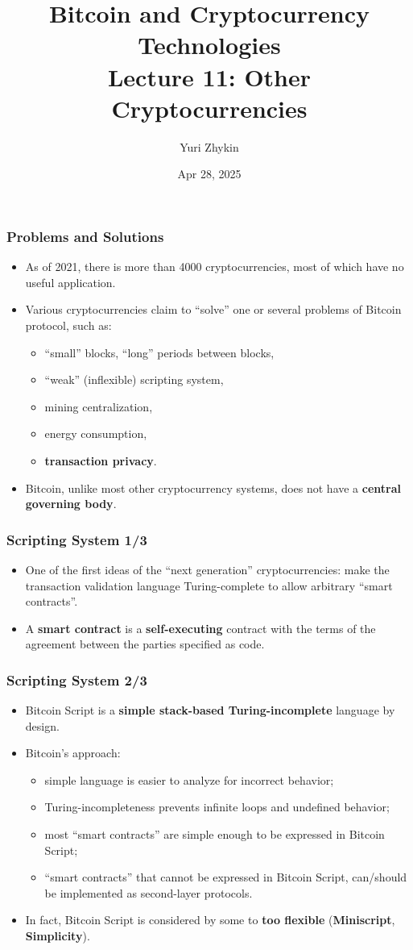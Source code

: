\documentclass{beamer}
\title{
  Bitcoin and Cryptocurrency Technologies \\
  Lecture 11: Other Cryptocurrencies
}
\author{Yuri Zhykin}
\date{Apr 28, 2025}
\begin{document}
\frame{\titlepage}

\begin{frame}
  \frametitle{Problems and Solutions}
  \begin{itemize}
  \item As of 2021, there is more than 4000 cryptocurrencies, most of which
    have no useful application.
  \item Various cryptocurrencies claim to ``solve'' one or several problems of
    Bitcoin protocol, such as:
    \begin{itemize}
    \item ``small'' blocks, ``long'' periods between blocks,
    \item ``weak'' (inflexible) scripting system,
    \item mining centralization,
    \item energy consumption,
    \item \textbf{transaction privacy}.
    \end{itemize}
  \item Bitcoin, unlike most other cryptocurrency systems, does not have a
    \textbf{central governing body}.
  \end{itemize}
\end{frame}

\begin{frame}
  \frametitle{Scripting System 1/3}
  \begin{itemize}
  \item One of the first ideas of the ``next generation'' cryptocurrencies: make
    the transaction validation language Turing-complete to allow arbitrary
    ``smart contracts''.
  \item A \textbf{smart contract} is a \textbf{self-executing} contract with the
    terms of the agreement between the parties specified as code.
  \end{itemize}
\end{frame}

\begin{frame}
  \frametitle{Scripting System 2/3}
  \begin{itemize}
  \item Bitcoin Script is a \textbf{simple stack-based Turing-incomplete}
    language by design.
  \item Bitcoin's approach:
    \begin{itemize}
    \item simple language is easier to analyze for incorrect behavior;
    \item Turing-incompleteness prevents infinite loops and undefined behavior;
    \item most ``smart contracts'' are simple enough to be expressed in Bitcoin
      Script;
    \item ``smart contracts'' that cannot be expressed in Bitcoin Script,
      can/should be implemented as second-layer protocols.
    \end{itemize}
  \item In fact, Bitcoin Script is considered by some to \textbf{too flexible}
    (\textbf{Miniscript}, \textbf{Simplicity}).
  \end{itemize}
\end{frame}
\end{document}
